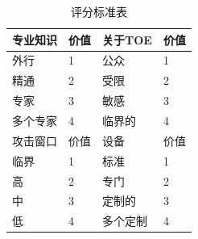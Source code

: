 \begin{table}
  \caption{评分标准表}
\begin{center}
  \begin{tabular}{|l|l|l|l|}
    \hline 专业知识 &价值&关于TOE&价值\\
    \hline 外行 & 1  &公众 & 1 \\
    \hline 精通 & 2  &受限 & 2 \\
    \hline 专家 & 3 & 敏感 & 3 \\
    \hline 多个专家 & 4  & 临界的  & 4 \\
    \hline 攻击窗口&价值&设备&价值 \\
    \hline 临界 & 1  &标准 & 1 \\
    \hline 高 & 2  &专门 & 2 \\
    \hline 中  & 3  & 定制的  & 3 \\
    \hline 低  & 4  &多个定制 & 4 \\
    \hline
  \end{tabular}
\end{center}
\end{table}

